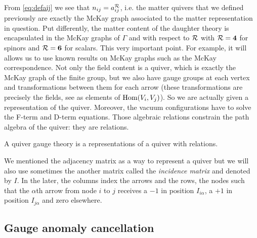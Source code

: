             From \eqref{eq:defaij} we see that $n_{ij}=a^{\mathcal{R}}_{ij}$, i.e. the matter quivers that we defined previously are exactly the McKay graph associated to the matter representation in question. Put differently, the matter content of the daughter theory is encapsulated in the McKay graphs of $\Gamma$ and with respect to $\mathcal{R}$ with $\mathcal{R}=\boldsymbol{4}$ for spinors and $\mathcal{R}=\boldsymbol{6}$ for scalars. This very important point. For example, it will allows us to use known results on McKay graphs such as the McKay correspondence. Not only the field content is a quiver, which is exactly the McKay graph of the finite group, but we also have gauge groups at each vertex and transformations between them for each arrow (these transformations are precisely the fields, see as elements of $\text{Hom}(V_i,V_j)$). So we are actually given a representation of the quiver. Moreover, the vacuum configurations have to solve the F-term and D-term equations. Those algebraic relations constrain the path algebra of the quiver: they are relations.
            \begin{result}
                A quiver gauge theory is a representations of a quiver with relations.
            \end{result}

            We mentioned the adjacency matrix as a way to represent a quiver but we will also use sometimes the another matrix called the \emph{incidence matrix} and denoted by $I$. In the later, the columns index the arrows and the rows, the nodes such that the $\alpha$th arrow from node $i$ to $j$ receives a $-1$ in position $I_{i\alpha}$, a $+1$ in position $I_{j\alpha}$ and zero elsewhere.

    \subsection{Gauge anomaly cancellation}

